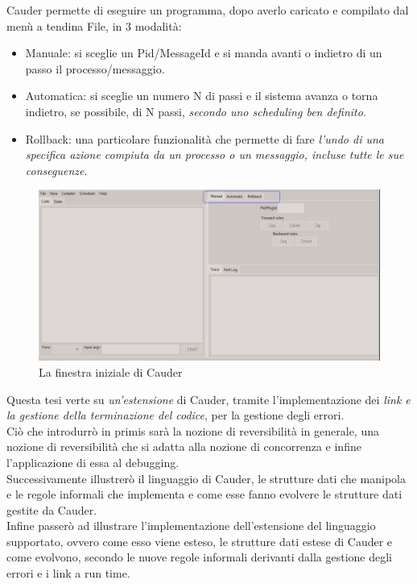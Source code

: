\documentclass[Tesi.tex]{subfiles}
\begin{document}
Cauder permette di eseguire un programma, dopo averlo caricato e compilato dal menù a tendina File, in 3 modalità:
\begin{itemize}
	\item Manuale: si sceglie un Pid/MessageId e si manda avanti o indietro di un passo il processo/messaggio.
	\item Automatica: si sceglie un numero N di passi e il sistema avanza o torna indietro, se possibile, di N passi, \textit{secondo uno scheduling ben definito}.
	\item Rollback: una particolare funzionalità che permette di fare \textit{l'undo di una specifica azione compiuta da un processo o un messaggio, incluse tutte le sue conseguenze}. 
\end{itemize}
\begin{figure}[H]
\centerline{\includegraphics[scale=0.4]{./Files/CauderPanoramica}}
\caption{La finestra iniziale di Cauder}
\label{fig1}
\end{figure}
Questa tesi verte su \textit{un'estensione} di Cauder, tramite l'implementazione dei \textit{link e la gestione della terminazione del codice}, per la gestione degli errori.\\
Ciò che introdurrò in primis sarà la nozione di reversibilità in generale, una nozione di reversibilità che si adatta alla nozione di concorrenza e infine l'applicazione di essa al debugging.\\
Successivamente illustrerò il linguaggio di Cauder, le strutture dati che manipola e le regole informali che implementa e come esse fanno evolvere le strutture dati gestite da Cauder.\\
Infine passerò ad illustrare l’implementazione dell’estensione del linguaggio supportato, ovvero come esso viene esteso, le strutture dati estese di  Cauder e come evolvono, secondo le nuove regole informali derivanti dalla gestione degli errori e i link a run time.
\end{document}
